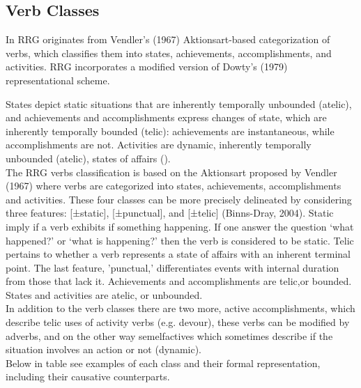 \subsection{Verb Classes}

In RRG originates from Vendler's (1967) Aktionsart-based categorization of verbs, which classifies them into states, achievements, accomplishments, and activities. RRG incorporates a modified version of Dowty's (1979) representational scheme.

States depict static situations that are inherently temporally unbounded (atelic), and achievements and accomplishments express changes of state, which
are inherently temporally bounded (telic): achievements are instantaneous, while accomplishments are not. Activities are dynamic, inherently temporally unbounded (atelic), states of affairs (\parencite{van1997syntax}).\\

The RRG verbs classification is based on the Aktionsart proposed by Vendler (1967) where verbs are categorized into states, achievements, accomplishments and activities. These four classes can be more precisely delineated by considering three features: [±static], [±punctual], and [±telic] (Binns-Dray, 2004). Static imply if a verb exhibits if something happening. If one answer the question ‘what happened?’ or ‘what is happening?’ then the verb is considered to be static. Telic pertains to whether a verb represents a state of affairs with an inherent terminal point. The last feature, 'punctual,' differentiates events with internal duration from those that lack it. Achievements and accomplishments are telic,or bounded. States and activities are atelic, or unbounded. \\

In addition to the verb classes there are two more,  active accomplishments, which describe telic uses
of activity verbs (e.g. devour), these verbs can be modified by adverbs, and on the other way semelfactives which sometimes describe if the situation involves an action or not (dynamic).\\

Below in table see examples of each class and their formal representation, including their causative counterparts.


